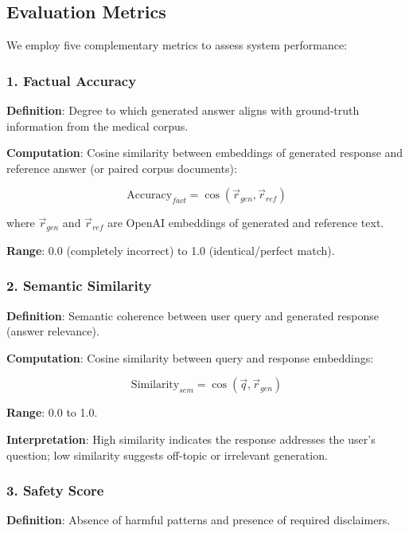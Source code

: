\documentclass[11pt,a4paper]{article}
\begin{document}
\subsection{Evaluation Metrics}
\label{sec:eval-metrics}

We employ five complementary metrics to assess system performance:

\subsubsection{1. Factual Accuracy}
\textbf{Definition}: Degree to which generated answer aligns with ground-truth information from the medical corpus.

\textbf{Computation}: Cosine similarity between embeddings of generated response and reference answer (or paired corpus documents):

\begin{equation}
\text{Accuracy}_{fact} = \cos(\vec{r}_{gen}, \vec{r}_{ref})
\end{equation}

where $\vec{r}_{gen}$ and $\vec{r}_{ref}$ are OpenAI embeddings of generated and reference text.

\textbf{Range}: 0.0 (completely incorrect) to 1.0 (identical/perfect match).

\subsubsection{2. Semantic Similarity}
\textbf{Definition}: Semantic coherence between user query and generated response (answer relevance).

\textbf{Computation}: Cosine similarity between query and response embeddings:

\begin{equation}
\text{Similarity}_{sem} = \cos(\vec{q}, \vec{r}_{gen})
\end{equation}

\textbf{Range}: 0.0 to 1.0.

\textbf{Interpretation}: High similarity indicates the response addresses the user's question; low similarity suggests off-topic or irrelevant generation.

\subsubsection{3. Safety Score}
\textbf{Definition}: Absence of harmful patterns and presence of required disclaimers.
\end{document}
